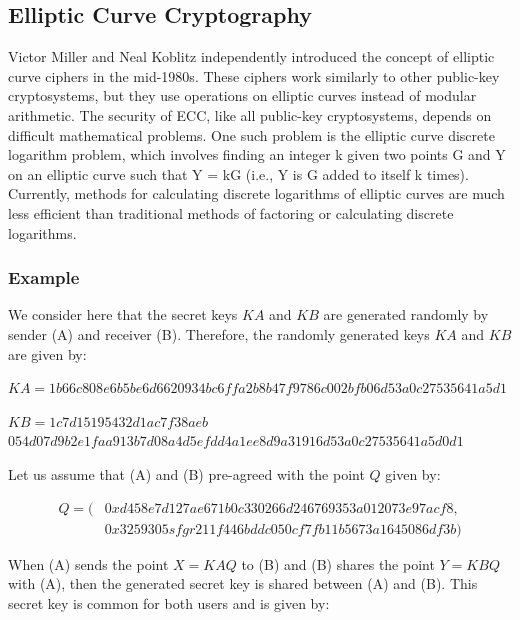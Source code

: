 \subsection{Elliptic Curve Cryptography}

Victor Miller and Neal Koblitz independently introduced the concept of elliptic curve ciphers in the mid-1980s. These ciphers work similarly to other public-key cryptosystems, but they use operations on elliptic curves instead of modular arithmetic. The security of \ac{ECC}, like all public-key cryptosystems, depends on difficult mathematical problems. One such problem is the elliptic curve discrete logarithm problem, which involves finding an integer k given two points G and Y on an elliptic curve such that Y = kG (i.e., Y is G added to itself k times). Currently, methods for calculating discrete logarithms of elliptic curves are much less efficient than traditional methods of factoring or calculating discrete logarithms.

\subsubsection{Example}

We consider here that the secret keys $KA$ and $KB$ are generated randomly by sender (A) and receiver (B). Therefore, the randomly generated keys $KA$ and $KB$ are given by:

\begin{flushleft}
$KA = 1b66c808e6b5be6d6620934bc6ff
a2b8b47f9786c002bfb06d53a0c27535641a5d1$
\end{flushleft}

\begin{flushleft}
    

    
$KB = 1c7d15195432d1ac7f38aeb$
$054d07d9b2e1faa913b7d08a4d5efdd4a1ee8d9a31916d53a0c275356
41a5d0d1$
\end{flushleft}

Let us assume that (A) and (B) pre-agreed with the point $Q$ given by:

\begin{equation*}
\begin{split}
Q = (&0xd458e7d127ae671b0c330266d246769353a012073e97acf8, \\
&0x3259305sfgr211f446bddc050cf7fb11b5673a1645086df3b)
\end{split}
\end{equation*}
  

When (A) sends the point $X = KAQ$ to (B) and (B) shares the point $Y = KBQ$ with (A), then the generated secret key is shared between (A) and (B). This secret key is common for both users and is given by:

